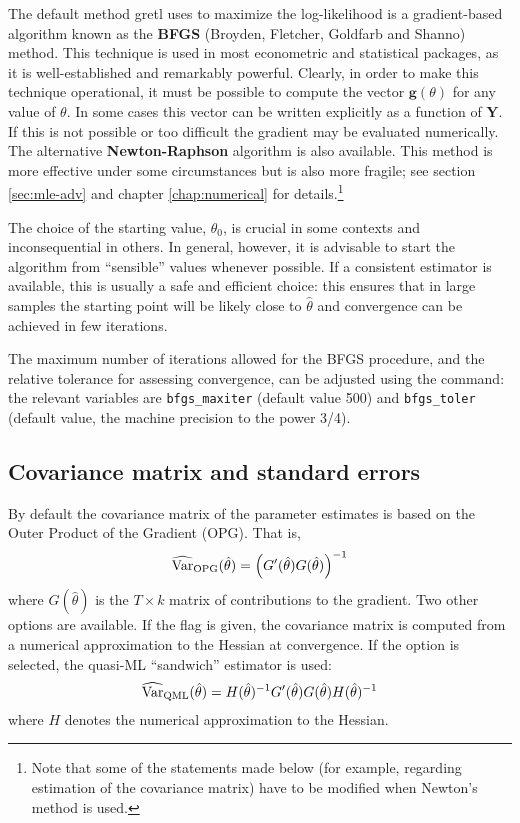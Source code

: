The default method gretl uses to maximize the log-likelihood is a
gradient-based algorithm known as the \textbf{BFGS} (Broyden,
Fletcher, Goldfarb and Shanno) method. This technique is used in most
econometric and statistical packages, as it is well-established and
remarkably powerful. Clearly, in order to make this technique
operational, it must be possible to compute the vector
$\mathbf{g}(\theta)$ for any value of $\theta$. In some cases this
vector can be written explicitly as a function of $\mathbf{Y}$. If
this is not possible or too difficult the gradient may be evaluated
numerically. The alternative \textbf{Newton-Raphson} algorithm is also
available. This method is more effective under some circumstances but
is also more fragile; see section \ref{sec:mle-adv} and chapter
\ref{chap:numerical} for details.\footnote{Note that some of the
  statements made below (for example, regarding estimation of the
  covariance matrix) have to be modified when Newton's method is
  used.}

The choice of the starting value, $\theta_0$, is crucial in some contexts
and inconsequential in others. In general, however, it is
advisable to start the algorithm from ``sensible'' values whenever
possible. If a consistent estimator is available, this is usually a
safe and efficient choice: this ensures that in large samples the
starting point will be likely close to $\hat{\theta}$ and convergence
can be achieved in few iterations. 

The maximum number of iterations allowed for the BFGS procedure, and
the relative tolerance for assessing convergence, can be adjusted
using the  command: the relevant variables are
\verb+bfgs_maxiter+ (default value 500) and \verb+bfgs_toler+ (default
value, the machine precision to the power 3/4).

\subsection{Covariance matrix and standard errors}

By default the covariance matrix of the parameter estimates is
based on the Outer Product of the Gradient (OPG).  That is,
\begin{equation}
  \label{eq:OPGmat}
  \widehat{\mbox{Var}}_{\mbox{\scriptsize OPG}}(\hat{\theta}) =
  \left(G'(\hat{\theta}) G(\hat{\theta}) \right)^{-1}
\end{equation}
where $G(\hat{\theta})$ is the $T \times k$ matrix of contributions to
the gradient.  Two other options are available.  If the
 flag is given, the covariance matrix is computed from
a numerical approximation to the Hessian at convergence.  If the
 option is selected, the quasi-ML ``sandwich''
estimator is used:
\[
\widehat{\mbox{Var}}_{\mbox{\scriptsize QML}}(\hat{\theta}) = H(\hat{\theta})^{-1}
  G'(\hat{\theta}) G(\hat{\theta}) H(\hat{\theta})^{-1}
\]
where $H$ denotes the numerical approximation to the Hessian.

